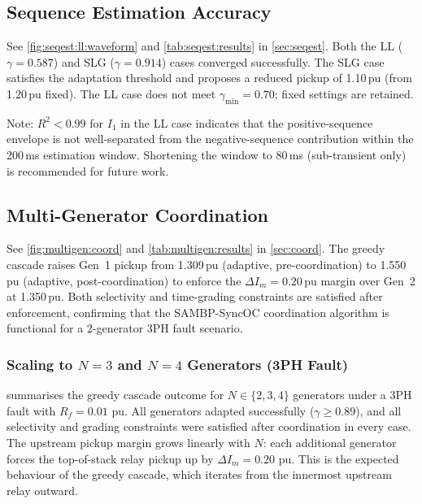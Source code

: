 \documentclass[12pt,a4paper]{article}
\theoremstyle{definition}
\theoremstyle{plain}
\newcommand{\pu}{\,\text{pu}}
\begin{document}
\subsection{Sequence Estimation Accuracy}
\label{sec:results:seq}

See \cref{fig:seqest:ll:waveform} and \cref{tab:seqest:results} in
\cref{sec:seqest}.  Both the LL ($\gamma=0.587$) and SLG ($\gamma=0.914$)
cases converged successfully.  The SLG case satisfies the adaptation
threshold and proposes a reduced pickup of 1.10\,pu (from 1.20\,pu fixed).
The LL case does not meet $\gamma_{\min}=0.70$; fixed settings are retained.

Note: $R^2 < 0.99$ for $I_1$ in the LL case indicates that the
positive-sequence envelope is not well-separated from the negative-sequence
contribution within the 200\,ms estimation window.  Shortening the window
to 80\,ms (sub-transient only) is recommended for future work.

\subsection{Multi-Generator Coordination}
\label{sec:results:coord}

See \cref{fig:multigen:coord} and \cref{tab:multigen:results} in
\cref{sec:coord}.  The greedy cascade raises Gen~1 pickup from
1.309\,pu (adaptive, pre-coordination) to 1.550\,pu (adaptive,
post-coordination) to enforce the $\Delta I_m = 0.20$\,pu margin
over Gen~2 at 1.350\,pu.  Both selectivity and time-grading constraints
are satisfied after enforcement, confirming that the SAMBP-SyncOC
coordination algorithm is functional for a 2-generator 3PH fault scenario.

\subsubsection{Scaling to $N=3$ and $N=4$ Generators (3PH Fault)}
\label{sec:results:coord:scaling}

 summarises the greedy cascade outcome for
$N \in \{2, 3, 4\}$ generators under a 3PH fault with $R_f = 0.01\,\pu$.
All generators adapted successfully ($\gamma \geq 0.89$), and all
selectivity and grading constraints were satisfied after coordination
in every case.  The upstream pickup margin grows linearly with $N$: each
additional generator forces the top-of-stack relay pickup up by
$\Delta I_m = 0.20\,\pu$.  This is the expected behaviour of the greedy
cascade, which iterates from the innermost upstream relay outward.
\end{document}
